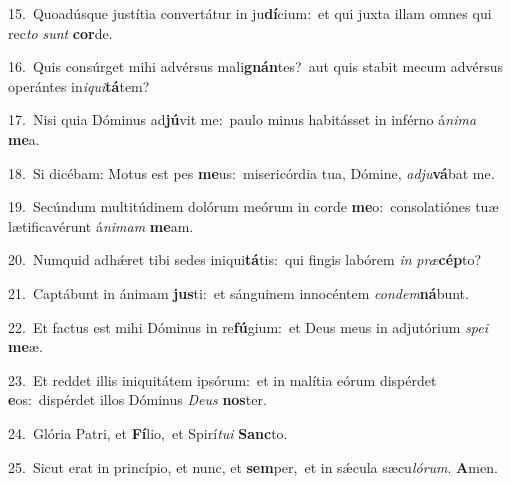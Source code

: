 {\numbfont\textcolor{\numbcolor}{15.}}~Quoadúsque justítia convertátur in ju\-\textbf{dí}\-cium:~\star et qui juxta illam omnes qui rec\textit{to} \textit{sunt} \textbf{cor}\-de.\par
{\numbfont\textcolor{\numbcolor}{16.}}~Quis consúrget mihi advérsus mali\-\textbf{gnán}\-tes?~\star aut quis stabit mecum advérsus operántes in\-\textit{i}\-\textit{qui}\textbf{tá}tem?\par
{\numbfont\textcolor{\numbcolor}{17.}}~Nisi quia Dóminus ad\-\textbf{jú}\-vit me:~\star paulo minus habitásset in inférno á\-\textit{ni}\-\textit{ma} \textbf{me}\-a.\par
{\numbfont\textcolor{\numbcolor}{18.}}~Si dicébam: Motus est pes \textbf{me}\-us:~\star misericórdia tua, Dómine, \textit{ad}\-\textit{ju}\textbf{vá}bat me.\par
{\numbfont\textcolor{\numbcolor}{19.}}~Secúndum multitúdinem dolórum meórum in corde \textbf{me}\-o:~\star consolatiónes tuæ lætificavérunt á\-\textit{ni}\-\textit{mam} \textbf{me}\-am.\par
{\numbfont\textcolor{\numbcolor}{20.}}~Numquid adhǽret tibi sedes iniqui\-\textbf{tá}\-tis:~\star qui fingis labórem \textit{in} \textit{præ}\-\textbf{cép}to?\par
{\numbfont\textcolor{\numbcolor}{21.}}~Captábunt in ánimam \textbf{jus}\-ti:~\star et sánguinem innocéntem \textit{con}\-\textit{dem}\textbf{ná}bunt.\par
{\numbfont\textcolor{\numbcolor}{22.}}~Et factus est mihi Dóminus in re\-\textbf{fú}\-gium:~\star et Deus meus in adjutórium \textit{spe}\-\textit{i} \textbf{me}\-æ.\par
{\numbfont\textcolor{\numbcolor}{23.}}~Et reddet illis iniquitátem ipsórum:~\dagger et in malítia eórum dispérdet \textbf{e}\-os:~\star dispérdet illos Dóminus \textit{De}\-\textit{us} \textbf{nos}\-ter.\par
{\numbfont\textcolor{\numbcolor}{24.}}~Glória Patri, et \textbf{Fí}\-lio,~\star et Spirí\-\textit{tu}\-\textit{i} \textbf{Sanc}\-to.\par
{\numbfont\textcolor{\numbcolor}{25.}}~Sicut erat in princípio, et nunc, et \textbf{sem}\-per,~\star et in sǽcula sæcu\-\textit{ló}\-\textit{rum}. \textbf{A}\-men.\par
